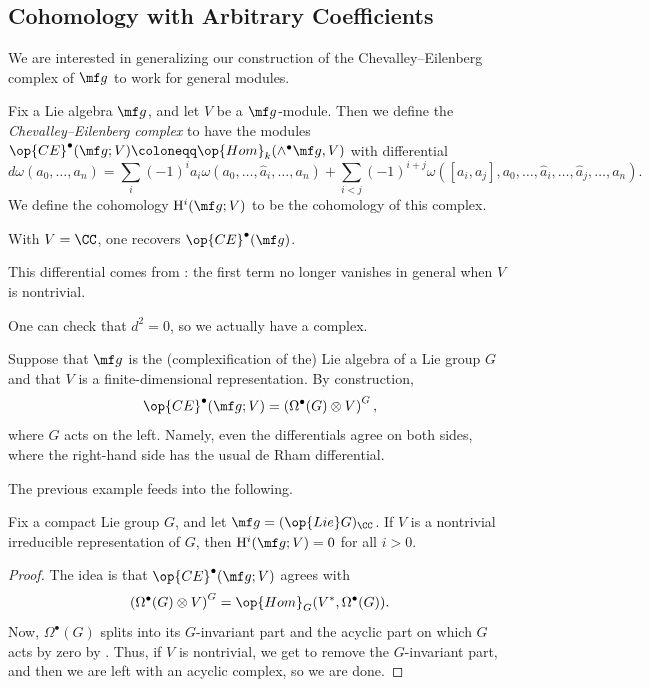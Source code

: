 \documentclass[../notes.tex]{subfiles}
\begin{document}
\subsection{Cohomology with Arbitrary Coefficients}
We are interested in generalizing our construction of the Chevalley--Eilenberg complex of $\mf g$ to work for general modules.
\begin{definition}
	Fix a Lie algebra $\mf g$, and let $V$ be a $\mf g$-module. Then we define the \textit{Chevalley--Eilenberg complex} to have the modules $\op{CE}^\bullet(\mf g;V)\coloneqq\op{Hom}_k(\land^\bullet\mf g,V)$ with differential
	\[d\omega(a_0,\ldots,a_n)=\sum_i(-1)^ia_i\omega(a_0,\ldots,\widehat a_i,\ldots,a_n)+\sum_{i<j}(-1)^{i+j}\omega([a_i,a_j],a_0,\ldots,\widehat a_i,\ldots,\widehat a_j,\ldots,a_n).\]
	We define the cohomology $\mathrm H^i(\mf g;V)$ to be the cohomology of this complex.
\end{definition}
\begin{example}
	With $V=\CC$, one recovers $\op{CE}^\bullet(\mf g)$.
\end{example}
\begin{remark}
	This differential comes from : the first term no longer vanishes in general when $V$ is nontrivial.
\end{remark}
\begin{remark}
	One can check that $d^2=0$, so we actually have a complex.
\end{remark}
\begin{example}
	Suppose that $\mf g$ is the (complexification of the) Lie algebra of a Lie group $G$ and that $V$ is a finite-dimensional representation. By construction,
	\[\op{CE}^\bullet(\mf g;V)=\left(\Omega^\bullet(G)\otimes V\right)^G,\]
	where $G$ acts on the left. Namely, even the differentials agree on both sides, where the right-hand side has the usual de Rham differential.
\end{example}
The previous example feeds into the following.
\begin{proposition} \label{prop:cohomology-vanishes}
	Fix a compact Lie group $G$, and let $\mf g=(\op{Lie}G)_\CC$. If $V$ is a nontrivial irreducible representation of $G$, then $\mathrm H^i(\mf g;V)=0$ for all $i>0$.
\end{proposition}
\begin{proof}
	The idea is that $\op{CE}^\bullet(\mf g;V)$ agrees with
	\[\left(\Omega^\bullet(G)\otimes V\right)^G=\op{Hom}_G(V^*,\Omega^\bullet(G)).\]
	Now, $\Omega^\bullet(G)$ splits into its $G$-invariant part and the acyclic part on which $G$ acts by zero by . Thus, if $V$ is nontrivial, we get to remove the $G$-invariant part, and then we are left with an acyclic complex, so we are done.
\end{proof}
\end{document}
